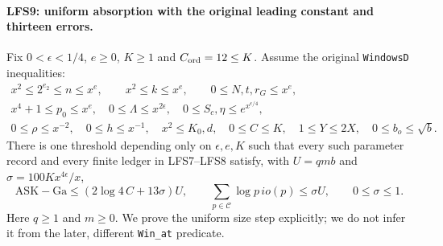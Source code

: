 \paragraph{LFS9: uniform absorption with the original leading constant and thirteen errors.}
\label{claim:LFS9}
Fix $0<\epsilon<1/4$, $e\ge0$, $K\ge1$ and
$C_{\rm ord}=12\le K$.  Assume the original
\texttt{WindowsD} inequalities:
\begin{gather*}
 x^2\le2^{e_2}\le n\le x^e,\qquad x^2\le k\le x^e,
 \qquad 0\le N,t,r_G\le x^e,\\
 x^4+1\le p_0\le x^e,\quad0\le\Lambda\le x^{2\epsilon},
 \quad0\le S_c,\eta\le e^{x^{\epsilon/4}},\\
 0\le\rho\le x^{-2},\quad0\le h\le x^{-1},\quad
 x^2\le K_0,d,\quad0\le C\le K,\quad
 1\le Y\le2X,\quad0\le b_o\le\sqrt b.                 \tag{LFS.19}
\end{gather*}
There is one threshold depending only on $\epsilon,e,K$ such that
every such parameter record and every finite ledger in LFS7--LFS8
satisfy, with $U=qmb$ and $\sigma=100Kx^{4\epsilon}/x$,
\[
 \mathrm{ASK}-\mathrm{Ga}
       \le(2\log4\,C+13\sigma)U,
 \qquad \sum_{p\in\mathcal C}\log p\,io(p)\le\sigma U,
 \qquad0\le\sigma\le1.                                \tag{LFS.20}
\]
Here $q\ge1$ and $m\ge0$.  We prove the uniform size step
explicitly; we do not infer it from the later, different
\texttt{Win\_at} predicate.

